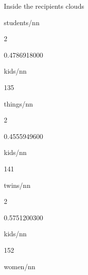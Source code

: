 \documentclass[
  ignorenonframetext,
]{beamer}
\begin{document}
\begin{frame}{Inside the recipients clouds}
\begin{itemize}
  students/nn

  2

  0.4786918000

  kids/nn

  135

  things/nn

  2

  0.4555949600

  kids/nn

  141

  twins/nn

  2

  0.5751200300

  kids/nn

  152

  women/nn
\end{itemize}
\end{frame}
\end{document}
